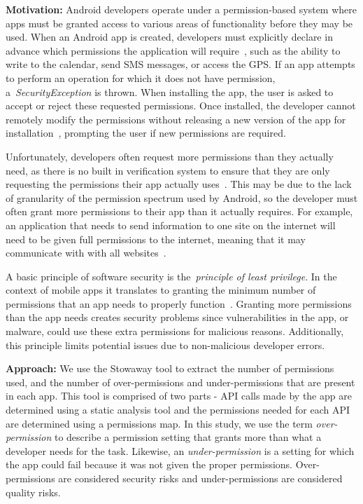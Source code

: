 \textbf{Motivation:} Android developers operate under a permission-based system where apps must be granted access to various areas of functionality before they may be used. When an Android app is created, developers must explicitly declare in advance which permissions the application will require~\cite{Felt:2011:APD:2046707.2046779}, such as the ability to write to the calendar, send SMS messages, or access the GPS. If an app attempts to perform an operation for which it does not have permission, a~\emph{SecurityException} is thrown. When installing the app, the user is asked to accept or reject these requested permissions. Once installed, the developer cannot remotely modify the permissions without releasing a new version of the app for installation~\cite{shaerpour2013trends}, prompting the user if new permissions are required.

Unfortunately, developers often request more permissions than they actually need, as there is no built in verification system to ensure that they are only requesting the permissions their app actually uses~\cite{Felt:2011:APD:2046707.2046779}. This may be due to the lack of granularity of the permission spectrum used by Android, so the developer must often grant more permissions to their app than it actually requires. For example, an application that needs to send information to one site on the internet will need to be given full permissions to the internet, meaning that it may communicate with with all websites~\cite{jeon2011dr}.

A basic principle of software security is the~\emph{principle of least privilege}. In the context of mobile apps it translates to granting the minimum number of permissions that an app needs to properly function~\cite{saltzer1975protection}. Granting more permissions than the app needs creates security problems since vulnerabilities in the app, or malware, could use these extra permissions for malicious reasons. Additionally, this principle limits potential issues due to non-malicious developer errors.

\textbf{Approach:} We use the Stowaway tool to extract the number of permissions used, and the number of over-permissions and under-permissions that are present in each app. This tool is comprised of two parts - API calls made by the app are determined using a static analysis tool and the permissions needed for each API are determined using a permissions map. In this study, we use the term \emph{over-permission} to describe a permission setting that grants more than what a developer needs for the task. Likewise, an \emph{under-permission} is a setting for which the app could fail because it was not given the proper permissions. Over-permissions are considered security risks and under-permissions are considered quality risks.

